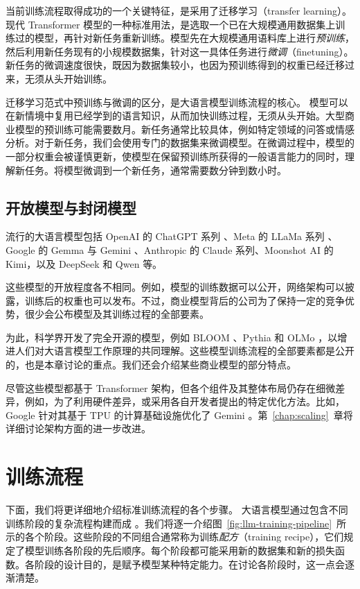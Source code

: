 当前训练流程取得成功的一个关键特征，是采用了迁移学习（transfer learning）。现代 Transformer 模型的一种标准用法，是选取一个已在大规模通用数据集上训练过的模型，再针对新任务重新训练。模型先在大规模通用语料库上进行{\em 预训练}，然后利用新任务现有的小规模数据集，针对这一具体任务进行{\em 微调}（finetuning）。新任务的微调速度很快，既因为数据集较小，也因为预训练得到的权重已经迁移过来，无须从头开始训练。

迁移学习范式中预训练与微调的区分，是大语言模型训练流程的核心。
模型可以在新情境中复用已经学到的语言知识，从而加快训练过程，无须从头开始。大型商业模型的预训练可能需要数月。新任务通常比较具体，例如特定领域的问答或情感分析。对于新任务，我们会使用专门的数据集来微调模型。在微调过程中，模型的一部分权重会被谨慎更新，使模型在保留预训练所获得的一般语言能力的同时，理解新任务。将模型微调到一个新任务，通常需要数分钟到数小时。

\subsection{开放模型与封闭模型}
\label{sec:pipeline-models}
流行的大语言模型包括 OpenAI 的 ChatGPT 系列 \citep{achiam2023gpt,ouyang2022training}、Meta 的 LLaMa 系列 \citep{touvron2023llama}、Google 的 Gemma \citep{chowdhery2023palm} 与 Gemini \citep{team2023gemini}、Anthropic 的 Claude 系列、Moonshot AI 的 Kimi，以及 DeepSeek \citep{guo2025deepseek} 和 Qwen \citep{bai2025qwen2} 等。

这些模型的开放程度各不相同。例如，模型的训练数据可以公开，网络架构可以披露，训练后的权重也可以发布。不过，商业模型背后的公司为了保持一定的竞争优势，很少会公布模型及其训练过程的全部要素。

为此，科学界开发了完全开源的模型，例如 BLOOM \citep{le2023bloom}、Pythia \citep{biderman2023pythia} 和 OLMo \citep{groeneveld2024olmoacceleratingsciencelanguage}，以增进人们对大语言模型工作原理的共同理解。这些模型训练流程的全部要素都是公开的，也是本章讨论的重点。我们还会介绍某些商业模型的部分特点。

尽管这些模型都基于 Transformer 架构，但各个组件及其整体布局仍存在细微差异，例如，为了利用硬件差异，或采用各自开发者提出的特定优化方法。比如，Google 针对其基于 TPU 的计算基础设施优化了 Gemini \citep{jouppi2023tpu}。第~\ref{chap:scaling}~章将详细讨论架构方面的进一步改进。

\section{训练流程}
\label{sec:pipeline-training}
下面，我们将更详细地介绍标准训练流程的各个步骤。
大语言模型通过包含不同训练阶段的复杂流程构建而成 \citep{radford2019language,minaee2024large}。我们将逐一介绍图~\ref{fig:llm-training-pipeline}~所示的各个阶段。这些阶段的不同组合通常称为训练{\em 配方}（training recipe），它们规定了模型训练各阶段的先后顺序。每个阶段都可能采用新的数据集和新的损失函数。各阶段的设计目的，是赋予模型某种特定能力。在讨论各阶段时，这一点会逐渐清楚。

